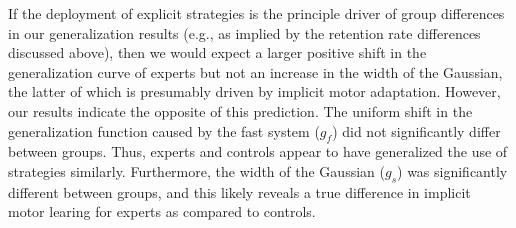 \documentclass[jou, apacite, 11pt, longtable, floatsintext, notab]{apa6}
\begin{document}
If the deployment of explicit strategies is the principle
driver of group differences in our generalization results
(e.g., as implied by the retention rate differences
discussed above), then we would expect a larger positive
shift in the generalization curve of experts but not an
increase in the width of the Gaussian, the latter of which is presumably
driven by implicit motor adaptation. However, our results
indicate the opposite of this prediction. The uniform shift
in the generalization function caused by the fast system
($g_f$) did not significantly differ between groups. Thus,
experts and controls appear to have generalized the use of
strategies similarly. Furthermore, the width of the Gaussian
($g_s$) was significantly different between groups, and this
likely reveals a true difference in implicit motor learing
for experts as compared to controls.


\end{document}
